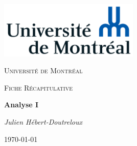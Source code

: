 \documentclass{article}[babel]
\begin{document}
	\begin{titlepage}
		\centering
		\includegraphics[width=0.5\textwidth]{Universite_de_Montreal_logo}\par\vspace{1cm}
		{\scshape\LARGE Université de Montréal\par}
		\vspace{1cm}
		{\scshape\Large Fiche Récapitulative\par}
		\vspace{1.5cm}
		{\huge\bfseries Analyse I\par}
		\vspace{2cm}
		{\Large\itshape Julien Hébert-Doutreloux\par}
		\vfill
		\vfill
		{\large \today\par}
	\end{titlepage}
		\setcounter{page}{2}
		\tableofcontents
		\newpage
		
		
		
		
		
		
		
		
		\newpage
		\onecolumn
		\printindex
\end{document}
